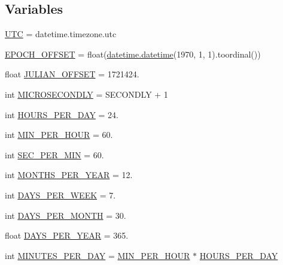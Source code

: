 \subsection*{Variables}
\begin{DoxyCompactItemize}
\item 
\hyperlink{namespacematplotlib_1_1dates_a32991c63c3f402a786a6a34373a9763c}{U\+TC} = datetime.\+timezone.\+utc
\item 
\hyperlink{namespacematplotlib_1_1dates_a9f52d1392a1c0fdf9c2519f37293fed0}{E\+P\+O\+C\+H\+\_\+\+O\+F\+F\+S\+ET} = float(\hyperlink{noprefix_8h_ac3c82bfcab9db06392d08bb501c432fc}{datetime.\+datetime}(1970, 1, 1).toordinal())
\item 
float \hyperlink{namespacematplotlib_1_1dates_a99372bd08650017dc015a528553fc743}{J\+U\+L\+I\+A\+N\+\_\+\+O\+F\+F\+S\+ET} = 1721424.
\item 
int \hyperlink{namespacematplotlib_1_1dates_a01c4e79726b660c359fcb64afdaf99c1}{M\+I\+C\+R\+O\+S\+E\+C\+O\+N\+D\+LY} = S\+E\+C\+O\+N\+D\+LY + 1
\item 
int \hyperlink{namespacematplotlib_1_1dates_a561a350df6e297468616ec46a3596a42}{H\+O\+U\+R\+S\+\_\+\+P\+E\+R\+\_\+\+D\+AY} = 24.
\item 
int \hyperlink{namespacematplotlib_1_1dates_a75caa1103515f8db461fd6fa5b28fbfa}{M\+I\+N\+\_\+\+P\+E\+R\+\_\+\+H\+O\+UR} = 60.
\item 
int \hyperlink{namespacematplotlib_1_1dates_a172ba09abbadd87e4810d6ac8762cf44}{S\+E\+C\+\_\+\+P\+E\+R\+\_\+\+M\+IN} = 60.
\item 
int \hyperlink{namespacematplotlib_1_1dates_a08b6a965b86ec2a046cfa4250383e113}{M\+O\+N\+T\+H\+S\+\_\+\+P\+E\+R\+\_\+\+Y\+E\+AR} = 12.
\item 
int \hyperlink{namespacematplotlib_1_1dates_a2c3de14819f311d36b4b62828036d0ae}{D\+A\+Y\+S\+\_\+\+P\+E\+R\+\_\+\+W\+E\+EK} = 7.
\item 
int \hyperlink{namespacematplotlib_1_1dates_ae41267b519d32846b5ce97c359897afe}{D\+A\+Y\+S\+\_\+\+P\+E\+R\+\_\+\+M\+O\+N\+TH} = 30.
\item 
float \hyperlink{namespacematplotlib_1_1dates_a5669fb9f55b61af7f162e959001d1e0a}{D\+A\+Y\+S\+\_\+\+P\+E\+R\+\_\+\+Y\+E\+AR} = 365.
\item 
int \hyperlink{namespacematplotlib_1_1dates_a152daa17af3d75f1442c9c2a03869357}{M\+I\+N\+U\+T\+E\+S\+\_\+\+P\+E\+R\+\_\+\+D\+AY} = \hyperlink{namespacematplotlib_1_1dates_a75caa1103515f8db461fd6fa5b28fbfa}{M\+I\+N\+\_\+\+P\+E\+R\+\_\+\+H\+O\+UR} $\ast$ \hyperlink{namespacematplotlib_1_1dates_a561a350df6e297468616ec46a3596a42}{H\+O\+U\+R\+S\+\_\+\+P\+E\+R\+\_\+\+D\+AY}

\end{DoxyCompactItemize}
